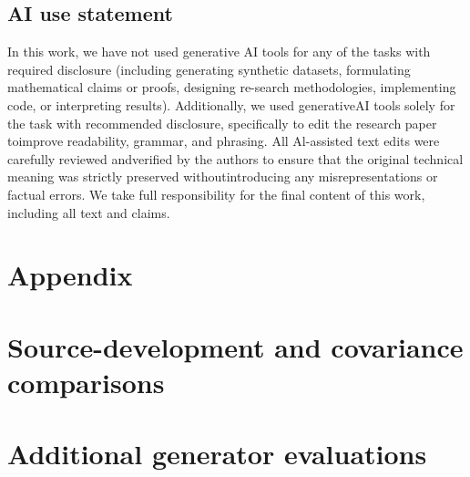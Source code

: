 \documentclass{article}
\begin{document}
\subsection*{AI use statement}
In this work, we have not used generative AI tools for any of the tasks with required disclosure
(including generating synthetic datasets, formulating mathematical claims or proofs, designing re-search methodologies, implementing code, or interpreting results). Additionally, we used generativeAI tools solely for the task with recommended disclosure, specifically to edit the research paper toimprove readability, grammar, and phrasing. All Al-assisted text edits were carefully reviewed andverified by the authors to ensure that the original technical meaning was strictly preserved withoutintroducing any misrepresentations or factual errors. We take full responsibility for the final content
of this work, including all text and claims.




\clearpage
\appendix
\section*{Appendix}
\label{app:start}







\section{Source-development and covariance comparisons}\label{app:source-panels}




\section{Additional generator evaluations}\label{app:earlier-readouts}

















\end{document}
